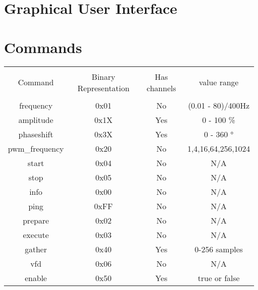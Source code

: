 \documentclass{article}
\begin{document}
\section{Graphical User Interface}

\section{Commands}
\label{sec:Commands}
\begin{tabular}{c c c c}
	\hline \\
	Command & Binary Representation & Has channels & value range\\
	\hline \hline \\
	frequency & 0x01 & No & (0.01 - 80)/400\si{\hertz}\\
	amplitude & 0x1X & Yes & 0 - 100 \si{\percent}\\
	phaseshift & 0x3X & Yes & 0 - 360 \si{\degree}\\
	pwm\_frequency & 0x20 & No & 1,4,16,64,256,1024 \\
	start & 0x04 & No & N/A \\
	stop & 0x05 & No & N/A \\
	info & 0x00 & No & N/A \\
	ping & 0xFF & No & N/A \\
	prepare & 0x02 & No & N/A \\
	execute & 0x03 & No & N/A \\
	gather & 0x40 & Yes & 0-256 samples \\
	vfd & 0x06 & No & N/A \\
	enable & 0x50 & Yes & true or false \\
	\hline
\end{tabular}
\end{document}
